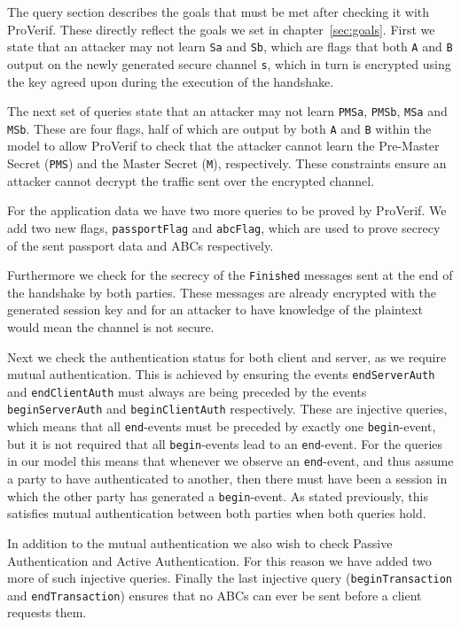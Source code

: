 The query section describes the goals that must be met after checking it with ProVerif. These directly reflect the goals we set in chapter~\ref{sec:goals}. First we state that an attacker may not learn \texttt{Sa} and \texttt{Sb}, which are flags that both \texttt{A} and \texttt{B} output on the newly generated secure channel \texttt{s}, which in turn is encrypted using the key agreed upon during the execution of the handshake.

The next set of queries state that an attacker may not learn \texttt{PMSa}, \texttt{PMSb}, \texttt{MSa} and \texttt{MSb}. These are four flags, half of which are output by both \texttt{A} and \texttt{B} within the model to allow ProVerif to check that the attacker cannot learn the Pre-Master Secret (\texttt{PMS}) and the Master Secret (\texttt{M}), respectively. These constraints ensure an attacker cannot decrypt the traffic sent over the encrypted channel.

For the application data we have two more queries to be proved by ProVerif. We add two new flags, \texttt{passportFlag} and \texttt{abcFlag}, which are used to prove secrecy of the sent passport data and ABCs respectively.

Furthermore we check for the secrecy of the \texttt{Finished} messages sent at the end of the handshake by both parties. These messages are already encrypted with the generated session key and for an attacker to have knowledge of the plaintext would mean the channel is not secure.

Next we check the authentication status for both client and server, as we require mutual authentication. This is achieved by ensuring the events \texttt{end\-Server\-Auth} and \texttt{end\-Client\-Auth} must always are being preceded by the events \texttt{begin\-Server\-Auth} and \texttt{begin\-Client\-Auth} respectively. These are injective queries, which means that all \texttt{end}-events must be preceded by exactly one \texttt{begin}-event, but it is not required that all \texttt{begin}-events lead to an \texttt{end}-event. For the queries in our model this means that whenever we observe an \texttt{end}-event, and thus assume a party to have authenticated to another, then there must have been a session in which the other party has generated a \texttt{begin}-event. As stated previously, this satisfies mutual authentication between both parties when both queries hold.

In addition to the mutual authentication we also wish to check Passive Authentication and Active Authentication. For this reason we have added two more of such injective queries. Finally the last injective query (\texttt{beginTransaction} and \texttt{end\-Transaction}) ensures that no ABCs can ever be sent before a client requests them.

